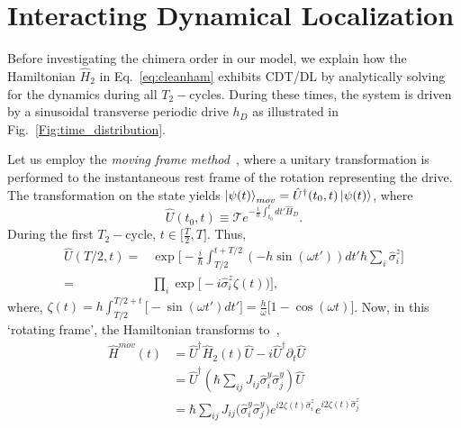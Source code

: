 \documentclass[
nofootinbib,
reprint,
superscriptaddress,
amsmath,amssymb,showkeys,
aps,
prb,
]{revtex4-2}
\begin{document}
	\section{\label{sec:level2} Interacting Dynamical Localization}
	
	Before investigating the chimera order in our model, we explain how the Hamiltonian $\hat{H}_2$ in Eq.~\eqref{eq:cleanham} exhibits CDT/DL by analytically solving for the dynamics during all $T_2-$cycles. During these times,  the system is driven by a sinusoidal transverse periodic drive $h_D$ as illustrated in Fig.~\ref{Fig:time_distribution}.
	
	Let us employ the \textit{moving frame method}~\cite{haldar_dynamical_2021}, where a unitary transformation is performed to the instantaneous rest frame of the rotation representing the drive. The transformation on the state yields $\ket{\psi(t)}_{mov} = \hat{U}^\dagger(t_0,t) \ket{\psi(t)}$, where 
	\begin{equation}
		\hat{U}(t_0,t) \equiv \mathcal{T} e^{-\frac{i}{\hbar}\int_{t_0}^{t} dt' \hat{H}_D}.
		\label{eq:rot1}
	\end{equation}
	During the first $T_2-$cycle, $t \in{\Big[\frac{T}{2}, T \Big]}$. Thus,
	\begin{align}
		\hat{U}\left(T/2,t\right) =& \exp \Bigg[-\frac{i}{\hbar}\int_{T/2}^{t+T/2} (-h \sin(\omega t'))dt'\hbar\sum_i\hat{\sigma}^z_i\Bigg]\nonumber\\
		=& \prod_{i} \exp\Big[-i \hat{\sigma}^z_i\zeta(t))\Big],
	\end{align}	
	where, $\displaystyle{
		\zeta (t) = h\int_{T/2}^{T/2+t}  \Big[-\sin(\omega t')dt'\Big]=  \frac{h}{\omega}\Big[1-\cos(\omega t)\Big]}$.		
	Now, in this `rotating frame', the Hamiltonian transforms to~\cite{haldar_dynamical_2021},
	\begin{align}
		\hat{H}^{mov}(t) &= \hat{U}^\dagger \hat{H}_2(t) \hat{U}- i \hat{U}^\dagger \partial_t \hat{U}\nonumber\\
		&= \hat{U}^\dagger \left(\hbar\sum_{ij}J_{ij}\hat{\sigma}^y_i\hat{\sigma}^y_j\right) \hat{U}\nonumber\\
		&=\hbar\sum_{ij} J_{ij} \Big(\hat{\sigma}^y_i\hat{\sigma}^y_j\Big) e^{i 2\zeta(t) \hat{\sigma}^z_i}  e^{i 2\zeta(t) \hat{\sigma}^z_j}
		\label{eq:movham}
	\end{align}
	
\end{document}
